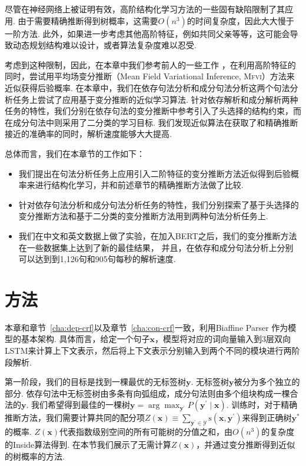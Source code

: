 尽管在神经网络上被证明有效，高阶结构化学习方法的一些固有缺陷限制了其应用.
由于需要精确推断得到树概率，这需要$O(n^3)$的时间复杂度，因此大大慢于一阶方法.
此外，如果进一步考虑其他高阶特征，例如共同父亲等等，这可能会导致动态规划结构难以设计，或者算法复杂度难以忍受.

考虑到这种限制，因此，在本章中我们参考前人的一些工作 \citep{smith-eisner-2008-dependency,wang-etal-2019-second,wang-tu-2020-second}，在利用高阶特征的同时，尝试用平均场变分推断（Mean Field Variational Inference, \textsc{Mfvi}）方法来近似获得后验概率.
在本章中，我们在依存句法分析和成分句法分析这两个句法分析任务上尝试了应用基于变分推断的近似学习算法.
针对依存解析和成分解析两种任务的特性，我们分别在依存句法的变分推断中参考\cite{wang-tu-2020-second}引入了头选择的结构约束，而在成分句法中则采用了二分类的学习目标.
我们发现近似算法在获取了和精确推断接近的准确率的同时，解析速度能够大大提高.

总体而言，我们在本章节的工作如下：
\begin{itemize}
  \item 我们提出在句法分析任务上应用引入二阶特征的变分推断方法近似得到后验概率来进行结构化学习，并和前述章节的精确推断方法做了比较.
  \item 针对依存句法分析和成分句法分析任务的特性，我们分别探索了基于头选择的变分推断方法和基于二分类的变分推断方法用到两种句法分析任务上.
  \item 我们在中文和英文数据上做了实验，在加入BERT之后，我们的变分推断方法在一些数据集上达到了新的最佳结果，
        并且，在依存和成分句法分析上分别可以达到到1,126句和905句每秒的解析速度.
\end{itemize}

\section{方法}\label{sec:vi-approach}

本章和章节~\ref{cha:dep-crf}以及章节~\ref{cha:con-crf}一致，利用Biaffine Parser \citep{dozat-etal-2017-biaffine,wang-tu-2020-second}作为模型的基本架构.
具体而言，给定一个句子$\boldsymbol{x}$，模型将对应的词向量输入到3层双向LSTM来计算上下文表示，然后将上下文表示分别输入到两个不同的模块进行两阶段解析.

第一阶段，我们的目标是找到一棵最优的无标签树$\boldsymbol{y}$.
无标签树$\boldsymbol{y}$被分为多个独立的部分.
依存句法中无标签树由多条有向弧组成，成分句法则由多个组块构成一棵合法的$\boldsymbol{y}$.
我们希望得到最佳的一棵树$\boldsymbol{y}=\arg\max_{\boldsymbol{y}^{\prime}}P(\boldsymbol{y}^{\prime}\mid\boldsymbol{x})$.
训练时，对于精确推断方法，我们需要计算共同的配分项$Z(\boldsymbol{x})\equiv\sum_{\boldsymbol{y}^{\prime}\in\mathcal{Y}}\mathrm{s}(\boldsymbol{x},\boldsymbol{y}^{\prime})$来得到正确树$\boldsymbol{y}^{\ast}$的概率.
$Z(\boldsymbol{x})$代表指数级别空间的所有可能树的分值之和，由$O(n^3)$的复杂度的Inside算法得到.
在本节我们展示了无需计算$Z(\boldsymbol{x})$，并通过变分推断得到近似的树概率的方法.

